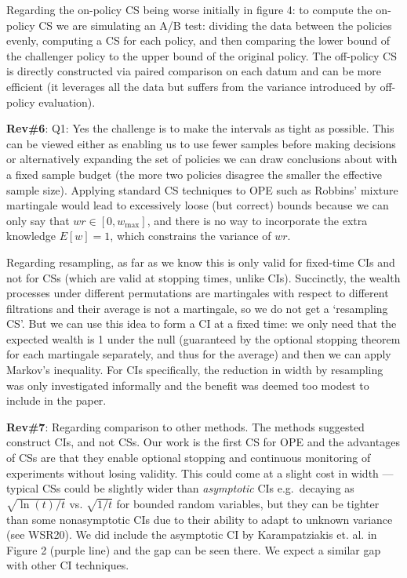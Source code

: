 \documentclass{article}
\begin{document}
Regarding the on-policy CS being worse initially in figure 4: to compute the on-policy CS we are simulating an A/B test: dividing the data between the policies evenly, computing a CS for each policy, and then comparing the lower bound of the challenger policy to the upper bound of the original policy.  The off-policy CS is directly constructed via paired comparison on each datum and can be more efficient (it leverages all the data but suffers from the variance introduced by off-policy evaluation).

\textbf{Rev\#6}: Q1: Yes the challenge is to make the intervals 
as tight as possible. This can be viewed either as enabling us
to use fewer samples before making decisions or alternatively
expanding the set of policies we can draw conclusions about 
with a fixed sample budget (the more two policies disagree the smaller
the effective sample size). Applying standard CS techniques 
to OPE such as Robbins' mixture martingale would lead to 
excessively loose (but correct) bounds because we can only say that 
$wr \in [0,w_{\max}]$, and there is no way to incorporate 
the extra knowledge $E[w]=1$, which constrains the variance of $wr$.

Regarding resampling, as far as we know this is only valid 
for fixed-time CIs and not for CSs (which are valid at stopping times, unlike CIs). Succinctly, the wealth processes under 
different permutations are martingales with respect to different
filtrations and their average is not a martingale, so we do not get a `resampling CS'. But we can use this idea to form a CI at a fixed time: we only need that the expected 
wealth is 1 under the null (guaranteed by the optional stopping theorem for each martingale separately, and thus for the average) and then we can apply Markov's inequality.
For CIs specifically, the reduction in width by resampling
was only investigated informally and the benefit was deemed
too modest to include in the paper. 


\textbf{Rev\#7}: Regarding comparison to other methods. The methods
suggested construct CIs, and not CSs. Our work is 
the first CS for OPE and the advantages of CSs are that they 
enable optional stopping and continuous monitoring of experiments
without losing validity. This could come at a slight cost in 
width --- typical CSs could be slightly wider than \emph{asymptotic} CIs e.g.\ decaying as $\sqrt{\ln(t)/t}$ vs. $\sqrt{1/t}$ for bounded random variables, but they can be tighter than some nonasymptotic CIs due to their ability to adapt to unknown variance (see WSR20).
We did include the asymptotic CI by Karampatziakis et. al. 
in Figure 2 (purple line) and the gap can be seen there.
We expect a similar gap with other CI techniques.
\end{document}
